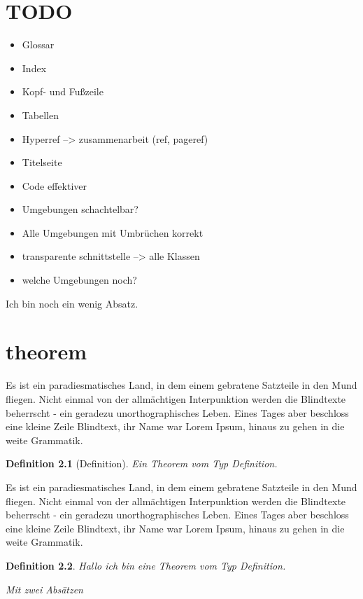 \documentclass[%
	12pt,%
	a4paper,%
	oneside,%
	liststotoc, idxtotoc, bibtotoc, %
	parskip=half,%
	nochapterprefix,%
	appendixprefix, %
	headings=small,%
]{scrreprt}
\newtheorem{definition}{Definition}
\begin{document}
\chapter{TODO}

\begin{itemize}
	\item Glossar
	\item Index
	\item Kopf- und Fußzeile
	\item Tabellen
	\item Hyperref --> zusammenarbeit (ref, pageref)
	\item Titelseite
	\item Code effektiver
	\item Umgebungen schachtelbar?
	\item Alle Umgebungen mit Umbrüchen korrekt
	\item transparente schnittstelle --> alle Klassen
	\item welche Umgebungen noch?
\end{itemize}

Ich bin noch ein wenig Absatz.

\chapter{theorem}


Es ist ein paradiesmatisches Land, in dem einem gebratene Satzteile in den Mund fliegen. Nicht einmal von der allmächtigen Interpunktion werden die Blindtexte beherrscht - ein geradezu unorthographisches Leben. Eines Tages aber beschloss eine kleine Zeile Blindtext, ihr Name war Lorem Ipsum, hinaus zu gehen in die weite Grammatik.

\begin{definition}[Definition]
Ein Theorem vom Typ Definition.
\end{definition}

Es ist ein paradiesmatisches Land, in dem einem gebratene Satzteile in den Mund fliegen. Nicht einmal von der allmächtigen Interpunktion werden die Blindtexte beherrscht - ein geradezu unorthographisches Leben. Eines Tages aber beschloss eine kleine Zeile Blindtext, ihr Name war Lorem Ipsum, hinaus zu gehen in die weite Grammatik.

\begin{definition}
Hallo ich bin eine Theorem vom Typ Definition.

Mit zwei Absätzen
\end{definition}
\end{document}
